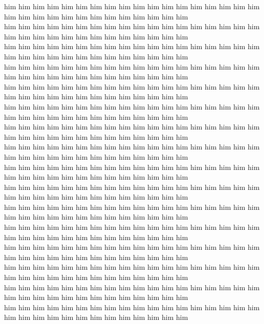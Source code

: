 him him him him him him him him him him him him him him him him him him him him him him him him him him him him him him him\\
him him him him him him him him him him him him him him him him him him him him him him him him him him him him him him him\\
him him him him him him him him him him him him him him him him him him him him him him him him him him him him him him him\\
him him him him him him him him him him him him him him him him him him him him him him him him him him him him him him him\\
him him him him him him him him him him him him him him him him him him him him him him him him him him him him him him him\\
him him him him him him him him him him him him him him him him him him him him him him him him him him him him him him him\\
him him him him him him him him him him him him him him him him him him him him him him him him him him him him him him him\\
him him him him him him him him him him him him him him him him him him him him him him him him him him him him him him him\\
him him him him him him him him him him him him him him him him him him him him him him him him him him him him him him him\\
him him him him him him him him him him him him him him him him him him him him him him him him him him him him him him him\\
him him him him him him him him him him him him him him him him him him him him him him him him him him him him him him him\\
him him him him him him him him him him him him him him him him him him him him him him him him him him him him him him him\\
him him him him him him him him him him him him him him him him him him him him him him him him him him him him him him him\\
him him him him him him him him him him him him him him him him him him him him him him him him him him him him him him him\\
him him him him him him him him him him him him him him him him him him him him him him him him him him him him him him him\\
him him him him him him him him him him him him him him him him him him him him him him him him him him him him him him him\\
